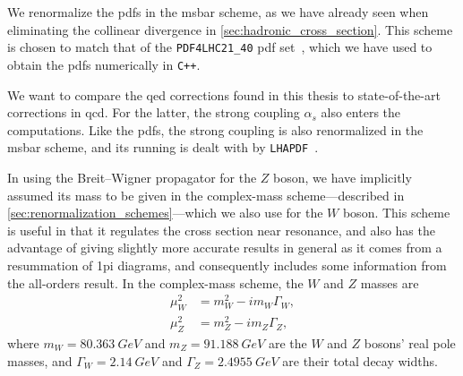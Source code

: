 We renormalize the \glspl{pdf} in the \gls{msbar} scheme, as we have already seen when eliminating the collinear divergence in \cref{sec:hadronic_cross_section}.
This scheme is chosen to match that of the \texttt{PDF4LHC21\_40} \gls{pdf} set~\cite{PDF4LHCWorkingGroup:2022cjn}, which we have used to obtain the \glspl{pdf} numerically in \texttt{C++}.

We want to compare the \gls{qed} corrections found in this thesis to state-of-the-art corrections in \gls{qcd}.
For the latter, the strong coupling $\alpha_s$ also enters the computations. Like the \glspl{pdf}, the strong coupling is also renormalized in the \gls{msbar} scheme, and its running is dealt with by \texttt{LHAPDF}~\cite{Buckley:2014ana}.

In using the Breit--Wigner propagator for the $Z$ boson, we have implicitly assumed its mass to be given in the complex-mass scheme---described in \cref{sec:renormalization_schemes}---which we also use for the $W$ boson.
This scheme is useful in that it regulates the cross section near resonance, and also has the advantage of giving slightly more accurate results in general as it comes from a resummation of \gls{1pi} diagrams, and consequently includes some information from the all-orders result.
In the complex-mass scheme, the $W$ and $Z$ masses are
\begin{subequations}
\label{eq:ZW_complex_masses}
\begin{align}
    \mu_W^2 &= m_W^2 - im_W \Gamma_W,
    \\
    \mu_Z^2 &= m_Z^2 - im_Z \Gamma_Z,
\end{align}
\end{subequations}
where $m_W=\qty{80.363}{GeV}$ and $m_Z = \qty{91.188}{GeV}$ are the $W$ and $Z$ bosons' real pole masses, and $\Gamma_W = \qty{2.14}{GeV}$ and $\Gamma_Z = \qty{2.4955}{GeV}$ are their total decay widths.

